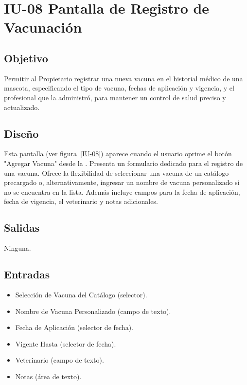 \section{IU-08 Pantalla de Registro de Vacunación}

\subsection{Objetivo}
    Permitir al Propietario registrar una nueva vacuna en el historial médico de una mascota, especificando el tipo de vacuna, fechas de aplicación y vigencia, y el profesional que la administró, para mantener un control de salud preciso y actualizado.

\subsection{Diseño}
    Esta pantalla  (ver figura~\ref{IU-08}) aparece cuando el usuario oprime el botón "Agregar Vacuna" desde la . Presenta un formulario dedicado para el registro de una vacuna. Ofrece la flexibilidad de seleccionar una vacuna de un catálogo precargado o, alternativamente, ingresar un nombre de vacuna personalizado si no se encuentra en la lista. Además incluye campos para la fecha de aplicación, fecha de vigencia, el veterinario y notas adicionales.

\subsection{Salidas}
    Ninguna.

\subsection{Entradas}
\begin{itemize}
    \item Selección de Vacuna del Catálogo (selector).
    \item Nombre de Vacuna Personalizado (campo de texto).
    \item Fecha de Aplicación (selector de fecha).
    \item Vigente Hasta (selector de fecha).
    \item Veterinario (campo de texto).
    \item Notas (área de texto).
\end{itemize}

